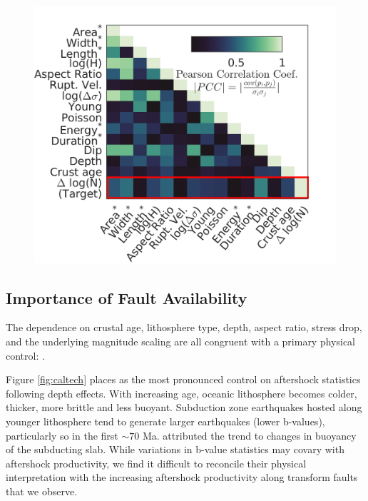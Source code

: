 \documentclass[draft, jgrga]{agujournal2018}
\begin{document}
 \begin{figure}
    \centering
    \includegraphics{figures/covariance_plot.png}
    \caption{}
    \label{fig:covariance}
\end{figure}   
    
\subsection{Importance of Fault Availability}

The dependence on crustal age, lithosphere type, depth, aspect ratio, stress drop, and the underlying magnitude scaling are all congruent with a primary physical control: . 

 Figure \ref{fig:caltech} places  as the most pronounced control on aftershock statistics following depth effects. With increasing age, oceanic lithosphere becomes colder, thicker, more brittle and less buoyant. Subduction zone earthquakes hosted along younger lithosphere tend to generate larger earthquakes (lower b-values), particularly so in the first $\sim70$ Ma. \citet{Nishikawa2014EarthquakeBuoyancy} attributed the trend to changes in buoyancy of the subducting slab. While variations in b-value statistics may covary with aftershock productivity, we find it difficult to reconcile their physical interpretation with the increasing aftershock productivity along transform faults that we observe. 
\end{document}
